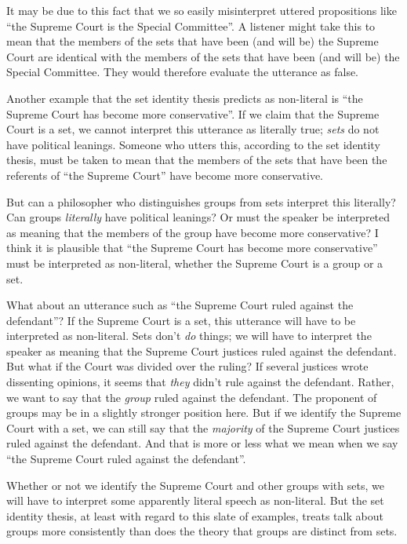 \documentclass[11pt]{article}
\begin{document}
\begin{spacing}{1.5}
It may be due to this fact that we so easily misinterpret uttered
propositions like ``the Supreme Court is the Special Committee''.  A
listener might take this to mean that the members of the sets that
have been (and will be) the Supreme Court are identical with the
members of the sets that have been (and will be) the Special
Committee.  They would therefore evaluate the utterance as false.

Another example that the set identity thesis predicts as non-literal
is ``the Supreme Court has become more conservative''.  If we claim
that the Supreme Court is a set, we cannot interpret this utterance as
literally true; {\em sets} do not have political leanings.  Someone
who utters this, according to the set identity thesis, must be taken
to mean that the members of the sets that have been the referents of
``the Supreme Court'' have become more conservative.

But can a philosopher who distinguishes groups from sets interpret
this literally?  Can groups {\em literally} have political leanings?
Or must the speaker be interpreted as meaning that the members of the
group have become more conservative?  I think it is plausible that
``the Supreme Court has become more conservative'' must be interpreted
as non-literal, whether the Supreme Court is a group or a set.

What about an utterance such as ``the Supreme Court ruled against the
defendant''?  If the Supreme Court is a set, this utterance will have
to be interpreted as non-literal.  Sets don't {\em do} things; we will
have to interpret the speaker as meaning that the Supreme Court
justices ruled against the defendant.  But what if the Court was
divided over the ruling?  If several justices wrote dissenting
opinions, it seems that {\em they} didn't rule against the defendant.
Rather, we want to say that the {\em group} ruled against the
defendant.  The proponent of groups may be in a slightly stronger
position here.  But if we identify the Supreme Court with a set, we
can still say that the {\em majority} of the Supreme Court justices
ruled against the defendant.  And that is more or less what we mean
when we say ``the Supreme Court ruled against the defendant''.

Whether or not we identify the Supreme Court and other groups with
sets, we will have to interpret some apparently literal speech as
non-literal.  But the set identity thesis, at least with regard to
this slate of examples, treats talk about groups more consistently
than does the theory that groups are distinct from sets.


\end{spacing}
\end{document}
